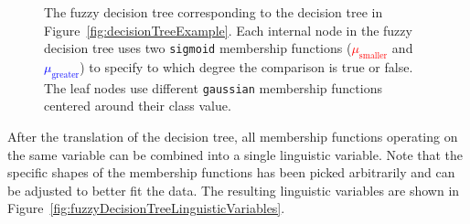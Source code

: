 \begin{figure}[h]

    \caption[Fuzzy decision tree created from the regular decision tree]{The fuzzy decision tree corresponding to the decision tree in Figure~\ref{fig:decisionTreeExample}. Each internal node in the fuzzy decision tree uses two \texttt{sigmoid} membership functions (\textcolor{red}{$\mu_{\text{smaller}}$} and \textcolor{blue}{$\mu_{\text{greater}}$}) to specify to which degree the comparison is true or false. The leaf nodes use different \texttt{gaussian} membership functions centered around their class value.}

    \label{fig:fuzzyDecisionTreeExample}
\end{figure}

After the translation of the decision tree, all membership functions operating on the same variable can be combined into a single linguistic variable. Note that the specific shapes of the membership functions has been picked arbitrarily and can be adjusted to better fit the data. The resulting linguistic variables are shown in Figure~\ref{fig:fuzzyDecisionTreeLinguisticVariables}.

